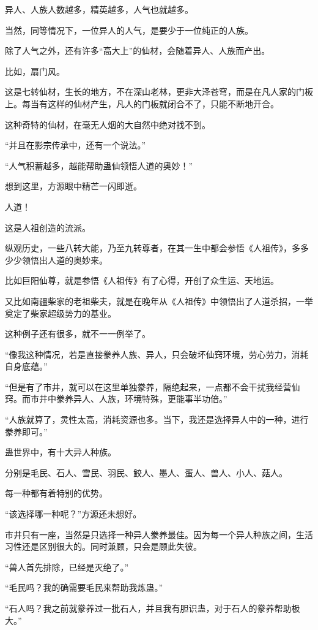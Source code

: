 \begin{this_body}
异人、人族人数越多，精英越多，人气也就越多。

当然，同等情况下，一位异人的人气，是要少于一位纯正的人族。

除了人气之外，还有许多“高大上”的仙材，会随着异人、人族而产出。

比如，扇门风。

这是七转仙材，生长的地方，不在深山老林，更非大泽苍穹，而是在凡人家的门板上。每当有这样的仙材产生，凡人的门板就闭合不了，只能不断地开合。

这种奇特的仙材，在毫无人烟的大自然中绝对找不到。

“并且在影宗传承中，还有一个说法。”

“人气积蓄越多，越能帮助蛊仙领悟人道的奥妙！”

想到这里，方源眼中精芒一闪即逝。

人道！

这是人祖创造的流派。

纵观历史，一些八转大能，乃至九转尊者，在其一生中都会参悟《人祖传》，多多少少领悟出人道的奥妙来。

比如巨阳仙尊，就是参悟《人祖传》有了心得，开创了众生运、天地运。

又比如南疆柴家的老祖柴夫，就是在晚年从《人祖传》中领悟出了人道杀招，一举奠定了柴家超级势力的基业。

这种例子还有很多，就不一一例举了。

“像我这种情况，若是直接豢养人族、异人，只会破坏仙窍环境，劳心劳力，消耗自身底蕴。”

“但是有了市井，就可以在这里单独豢养，隔绝起来，一点都不会干扰我经营仙窍。而市井中豢养异人、人族，环境特殊，更能事半功倍。”

“人族就算了，灵性太高，消耗资源也多。当下，我还是选择异人中的一种，进行豢养即可。”

蛊世界中，有十大异人种族。

分别是毛民、石人、雪民、羽民、鲛人、墨人、蛋人、兽人、小人、菇人。

每一种都有着特别的优势。

“该选择哪一种呢？”方源还未想好。

市井只有一座，当然是只选择一种异人豢养最佳。因为每一个异人种族之间，生活习性还是区别很大的。同时兼顾，只会是顾此失彼。

“兽人首先排除，已经是灭绝了。”

“毛民吗？我的确需要毛民来帮助我炼蛊。”

“石人吗？我之前就豢养过一批石人，并且我有胆识蛊，对于石人的豢养帮助极大。”


\end{this_body}
